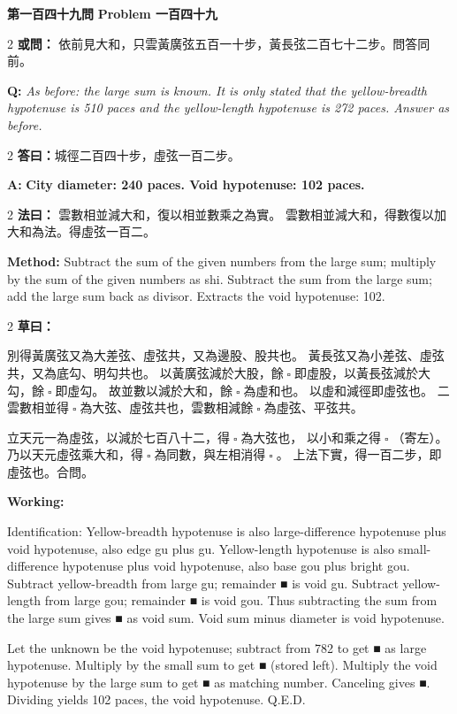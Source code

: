 \documentclass[11pt,a4paper]{article}
\let\origsquare\square
\renewcommand{\square}{\ensuremath{\origsquare}}%
\newcommand{\wen}[1]{%
  \par\vspace{0.5em}%
  \noindent\textcolor{problemcolor}{\textbf{第#1問}}%
  \hfill\textcolor{problemcolor}{\textbf{Problem #1}}\par\nopagebreak%
  \vspace{0.3em}%
}
\newcommand{\owen}[1]{%
  \noindent\textcolor{problemcolor}{\textbf{或問：}}{\tradfont #1}\par\nopagebreak%
}
\newcommand{\oweneng}[1]{%
  \noindent\textcolor{engcolor}{\textbf{Q: }}{\itshape #1}\par\nopagebreak%
}
\newcommand{\fayue}[1]{%
  \noindent\textcolor{methodcolor}{\textbf{法曰：}}{\tradfont #1}\par\nopagebreak%
}
\newcommand{\fayueeng}[1]{%
  \noindent\textcolor{engcolor}{\textbf{Method: }}{#1}\par\nopagebreak%
}
\newcommand{\tsaoyue}[1]{%
  \noindent\textcolor{workcolor}{\textbf{草曰：}}{\tradfont #1}\par%
}
\newcommand{\tsaoyueeng}[1]{%
  \noindent\textcolor{engcolor}{\textbf{Working: }}{\small #1}\par%
}
\newcommand{\dayue}[1]{%
  \noindent\textcolor{anscolor}{\textbf{答曰：}}{\tradfont #1}\par\nopagebreak%
}
\newcommand{\dayueeng}[1]{%
  \noindent\textcolor{engcolor}{\textbf{A: }}{\bfseries #1}\par\nopagebreak%
}
\begin{document}
\vspace{0.5cm}

\wen{一百四十九}

\begin{paracol}{2}
\owen{%
依前見大和，只雲黃廣弦五百一十步，黃長弦二百七十二步。問答同前。}
\switchcolumn
\oweneng{%
As before: the large sum is known. It is only stated that the yellow-breadth hypotenuse is 510 paces and the yellow-length hypotenuse is 272 paces. Answer as before.}
\end{paracol}

\begin{paracol}{2}
\dayue{城徑二百四十步，虛弦一百二步。}
\switchcolumn
\dayueeng{City diameter: 240 paces. Void hypotenuse: 102 paces.}
\end{paracol}

\begin{paracol}{2}
\fayue{%
雲數相並減大和，復以相並數乘之為實。
雲數相並減大和，得數復以加大和為法。得虛弦一百二。}
\switchcolumn
\fayueeng{%
Subtract the sum of the given numbers from the large sum; multiply by the sum of the given numbers as shi. Subtract the sum from the large sum; add the large sum back as divisor. Extracts the void hypotenuse: 102.}
\end{paracol}

\begin{paracol}{2}
\tsaoyue{%
別得黃廣弦又為大差弦、虛弦共，又為邊股、股共也。
黃長弦又為小差弦、虛弦共，又為底勾、明勾共也。
以黃廣弦減於大股，餘$ \; \square \; $即虛股，以黃長弦減於大勾，餘$ \; \square \; $即虛勾。
故並數以減於大和，餘$ \; \square \; $為虛和也。
以虛和減徑即虛弦也。
二雲數相並得$ \; \square \; $為大弦、虛弦共也，雲數相減餘$ \; \square \; $為虛弦、平弦共。

立天元一為虛弦，以減於七百八十二，得$ \; \square \; $為大弦也，
以小和乘之得$ \; \square \; $（寄左）。
乃以天元虛弦乘大和，得$ \; \square \; $為同數，與左相消得$ \; \square \; $。
上法下實，得一百二步，即虛弦也。合問。}
\switchcolumn
\tsaoyueeng{%
Identification: Yellow-breadth hypotenuse is also large-difference hypotenuse plus void hypotenuse, also edge gu plus gu. Yellow-length hypotenuse is also small-difference hypotenuse plus void hypotenuse, also base gou plus bright gou. Subtract yellow-breadth from large gu; remainder ■ is void gu. Subtract yellow-length from large gou; remainder ■ is void gou. Thus subtracting the sum from the large sum gives ■ as void sum. Void sum minus diameter is void hypotenuse.

Let the unknown be the void hypotenuse; subtract from 782 to get ■ as large hypotenuse. Multiply by the small sum to get ■ (stored left). Multiply the void hypotenuse by the large sum to get ■ as matching number. Canceling gives ■. Dividing yields 102 paces, the void hypotenuse. Q.E.D.}
\end{paracol}
\end{document}
